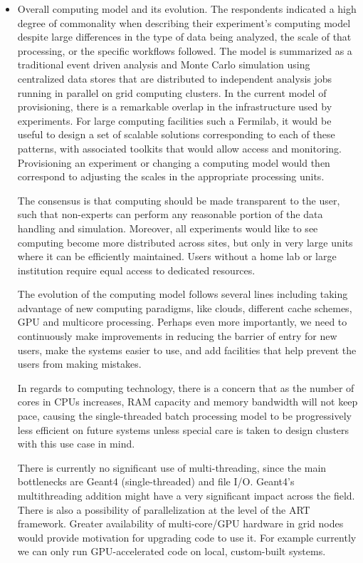 \begin{itemize}
\item Overall computing model and its evolution. The respondents indicated a high degree of commonality when describing their experiment's computing model despite large differences in the type of data being analyzed, the scale of that processing, or the specific workflows followed.  The model is summarized as a traditional event driven analysis and Monte Carlo simulation using centralized data stores that are distributed to independent analysis jobs running in parallel on grid computing clusters.  In the current model of provisioning, there is a remarkable overlap in the infrastructure used by experiments. For large computing facilities such a Fermilab, it would be useful to design a set of scalable solutions corresponding to each of these patterns, with associated toolkits that would allow access and monitoring. Provisioning an experiment or changing a computing model would then correspond to adjusting the scales in the appropriate processing units.

The consensus is that computing should be made transparent to the user, such that non-experts can perform any reasonable portion of the data handling and simulation.  Moreover, all experiments would like to see computing become more distributed across sites, but only in very large units where it can be efficiently maintained.  Users without a home lab or large institution require equal access to dedicated resources. 

The evolution of the computing model follows several lines including taking advantage of new computing paradigms, like clouds, different cache schemes, GPU and multicore processing.  Perhaps even more importantly, we need to continuously make improvements in reducing the barrier of entry for new users, make the systems easier to use, and add facilities that help prevent the users from making mistakes.

In regards to computing technology, there is a concern that as the number of cores in CPUs increases, RAM capacity and memory bandwidth will not keep pace, causing the single-threaded batch processing model to be progressively less efficient on future systems unless special care is taken to design clusters with this use case in mind. 

There is currently no significant use of multi-threading, since the main bottlenecks are Geant4 (single-threaded) and file I/O. Geant4's multithreading addition might have a very significant impact across the field. There is also a possibility of parallelization at the level of the ART framework. Greater availability of multi-core/GPU hardware in grid nodes would provide motivation for upgrading code to use it. For example currently we can only run GPU-accelerated code on local, custom-built systems. 

\end{itemize}

